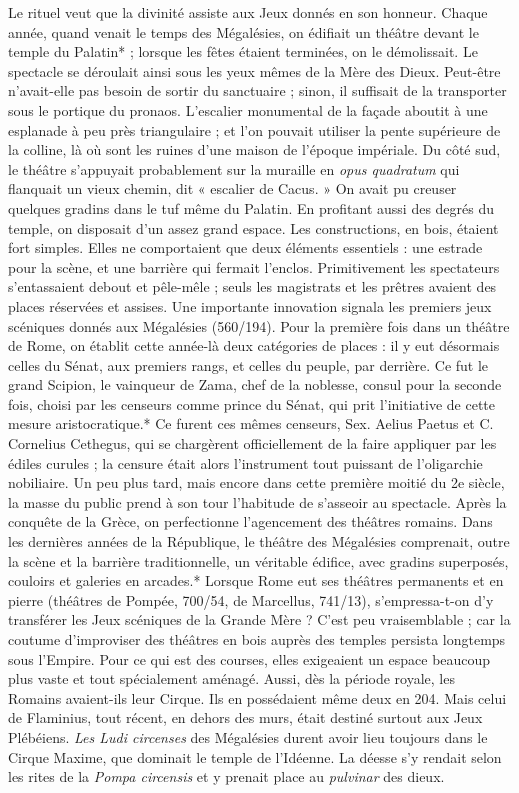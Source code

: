 \documentclass[a4paper, 11pt, oneside, polutonikogreek, french]{article}
\begin{document}
Le rituel veut que la divinité assiste aux Jeux donnés en son honneur. Chaque année, quand venait le temps des Mégalésies, on édifiait un théâtre devant le temple du Palatin* ; lorsque les fêtes étaient terminées, on le démolissait. Le spectacle se déroulait ainsi sous les yeux mêmes de la Mère des Dieux. Peut-être n'avait-elle pas besoin de sortir du sanctuaire ; sinon, il suffisait de la transporter sous le portique du pronaos. L'escalier monumental de la façade aboutit à une esplanade à peu près triangulaire ; et l'on pouvait utiliser la pente supérieure de la colline, là où sont les ruines d'une maison de l'époque impériale. Du côté sud, le théâtre s'appuyait probablement sur la muraille en \emph{opus quadratum} qui flanquait un vieux chemin, dit « escalier de Cacus. » On avait pu creuser quelques gradins dans le tuf même du Palatin. En profitant aussi des degrés du temple, on disposait d'un assez grand espace. Les constructions, en bois, étaient fort simples. Elles ne comportaient que deux éléments essentiels : une estrade pour la scène, et une barrière qui fermait l'enclos. Primitivement les spectateurs s'entassaient debout et pêle-mêle ; seuls les magistrats et les prêtres avaient des places réservées et assises. Une importante innovation signala les premiers jeux scéniques donnés aux Mégalésies (560/194). Pour la première fois dans un théâtre de Rome, on établit cette année-là deux catégories de places : il y eut désormais celles du Sénat, aux premiers rangs, et celles du peuple, par derrière. Ce fut le grand Scipion, le vainqueur de Zama, chef de la noblesse, consul pour la seconde fois, choisi par les censeurs comme prince du Sénat, qui prit l'initiative de cette mesure aristocratique.* Ce furent ces mêmes censeurs, Sex. Aelius Paetus et C. Cornelius Cethegus, qui se chargèrent officiellement de la faire appliquer par les édiles curules ; la censure était alors l'instrument tout puissant de l'oligarchie nobiliaire. Un peu plus tard, mais encore dans cette première moitié du 2e siècle, la masse du public prend à son tour l'habitude de s'asseoir au spectacle. Après la conquête de la Grèce, on perfectionne l'agencement des théâtres romains. Dans les dernières années de la République, le théâtre des Mégalésies comprenait, outre la scène et la barrière traditionnelle, un véritable édifice, avec gradins superposés, couloirs et galeries en arcades.* Lorsque Rome eut ses théâtres permanents et en pierre (théâtres de Pompée, 700/54, de Marcellus, 741/13), s'empressa-t-on d'y transférer les Jeux scéniques de la Grande Mère ? C'est peu vraisemblable ; car la coutume d'improviser des théâtres en bois auprès des temples persista longtemps sous l'Empire. Pour ce qui est des courses, elles exigeaient un espace beaucoup plus vaste et tout spécialement aménagé. Aussi, dès la période royale, les Romains avaient-ils leur Cirque. Ils en possédaient même deux en 204. Mais celui de Flaminius, tout récent, en dehors des murs, était destiné surtout aux Jeux Plébéiens. \emph{Les Ludi circenses} des Mégalésies durent avoir lieu toujours dans le Cirque Maxime, que dominait le temple de l'Idéenne. La déesse s'y rendait selon les rites de la \emph{Pompa circensis} et y prenait place au \emph{pulvinar} des dieux.
\end{document}
